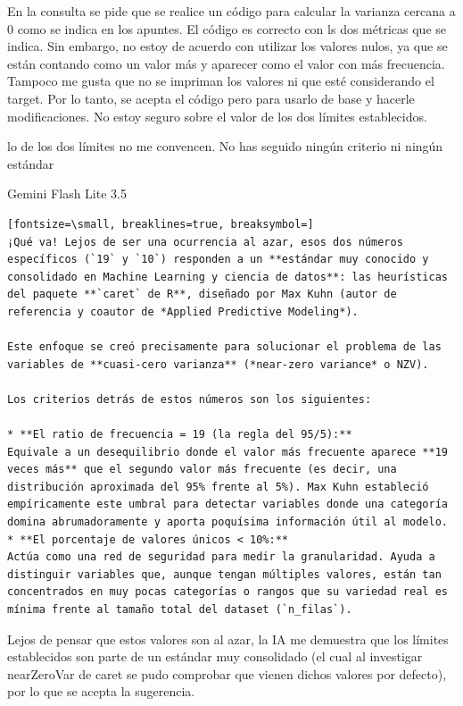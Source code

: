 \documentclass[12pt,a4paper,oneside]{book}
\begin{document}
\begin{iaanalisis}
En la consulta se pide que se realice un código para calcular la varianza cercana a 0 como se indica en los apuntes. El código es correcto con ls dos métricas que se indica. Sin embargo, no estoy de acuerdo con utilizar los valores nulos, ya que se están contando como un valor más y aparecer como el valor con más frecuencia. Tampoco me gusta que no se impriman los valores ni que esté considerando el target. Por lo tanto, se acepta el código pero para usarlo de base y hacerle modificaciones. No estoy seguro sobre el valor de los dos límites establecidos.
\end{iaanalisis}



\begin{iaprompt}
lo de los dos límites no me convencen. No has seguido ningún criterio ni ningún estándar
\end{iaprompt}
\begin{iaresp}{Gemini Flash Lite 3.5}
\begin{Verbatim}[fontsize=\small, breaklines=true, breaksymbol=]
¡Qué va! Lejos de ser una ocurrencia al azar, esos dos números específicos (`19` y `10`) responden a un **estándar muy conocido y consolidado en Machine Learning y ciencia de datos**: las heurísticas del paquete **`caret` de R**, diseñado por Max Kuhn (autor de referencia y coautor de *Applied Predictive Modeling*).

Este enfoque se creó precisamente para solucionar el problema de las variables de **cuasi-cero varianza** (*near-zero variance* o NZV).

Los criterios detrás de estos números son los siguientes:

* **El ratio de frecuencia = 19 (la regla del 95/5):**
Equivale a un desequilibrio donde el valor más frecuente aparece **19 veces más** que el segundo valor más frecuente (es decir, una distribución aproximada del 95% frente al 5%). Max Kuhn estableció empíricamente este umbral para detectar variables donde una categoría domina abrumadoramente y aporta poquísima información útil al modelo.
* **El porcentaje de valores únicos < 10%:**
Actúa como una red de seguridad para medir la granularidad. Ayuda a distinguir variables que, aunque tengan múltiples valores, están tan concentrados en muy pocas categorías o rangos que su variedad real es mínima frente al tamaño total del dataset (`n_filas`).

\end{Verbatim}
\end{iaresp}
\begin{iaanalisis}
Lejos de pensar que estos valores son al azar, la IA me demuestra que los límites establecidos son parte de un estándar muy consolidado (el cual al investigar nearZeroVar de caret se pudo comprobar que vienen dichos valores por defecto), por lo que se acepta la sugerencia.
\end{iaanalisis}
\end{document}

